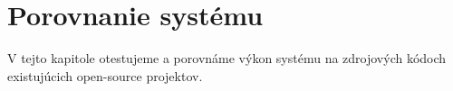 \chapter{Porovnanie syst\'{e}mu}
\label{ch:comp}

V tejto kapitole otestujeme a porovnáme výkon systému na zdrojových kódoch
existujúcich open-source projektov.
